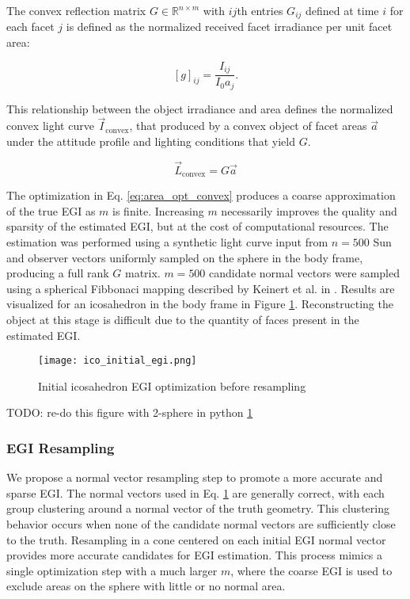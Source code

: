 The convex reflection matrix $G \in \mathbb{R}^{n \times m}$ with $ij$th entries $G_{ij}$ defined at time $i$ for each facet $j$ is defined as the normalized received facet irradiance per unit facet area:

\begin{equation} \label{ref_cond_matrix}
  [g]_{ij} = \frac{I_{ij}}{I_0 a_j}.
\end{equation}

This relationship between the object irradiance and area defines the normalized convex light curve $\vec{I}_{\textrm{convex}}$, that produced by a convex object of facet areas $\vec{a}$ under the attitude profile and lighting conditions that yield $G$.

\begin{equation} \label{convex_lc_with_g}
  \vec{L}_{\textrm{convex}} = G \vec{a}
\end{equation}

The optimization in Eq. \ref{eq:area_opt_convex} produces a coarse approximation of the true EGI as $m$ is finite. Increasing $m$ necessarily improves the quality and sparsity of the estimated EGI, but at the cost of computational resources. The estimation was performed using a synthetic light curve input from $n=500$ Sun and observer vectors uniformly sampled on the sphere in the body frame, producing a full rank $G$ matrix. $m = 500$ candidate normal vectors were sampled using a spherical Fibbonaci mapping described by Keinert et al. in \cite{keinert2015}. Results are visualized for an icosahedron in the body frame in Figure \ref{eq:initial_ico_resampling}. Reconstructing the object at this stage is difficult due to the quantity of faces present in the estimated EGI. 

\begin{figure}[!htb]
  \centering
  \texttt{[image: ico\_initial\_egi.png]}
  \caption{Initial icosahedron EGI optimization before resampling}
  \label{eq:initial_ico_resampling}
\end{figure}

TODO: re-do this figure with 2-sphere in python \ref{eq:initial_ico_resampling}

\subsubsection{EGI Resampling}

We propose a normal vector resampling step to promote a more accurate and sparse EGI. The normal vectors used in Eq. \ref{eq:initial_ico_resampling} are generally correct, with each group clustering around a normal vector of the truth geometry. This clustering behavior occurs when none of the candidate normal vectors are sufficiently close to the truth. Resampling in a cone centered on each initial EGI normal vector provides more accurate candidates for EGI estimation. This process mimics a single optimization step with a much larger $m$, where the coarse EGI is used to exclude areas on the sphere with little or no normal area.


